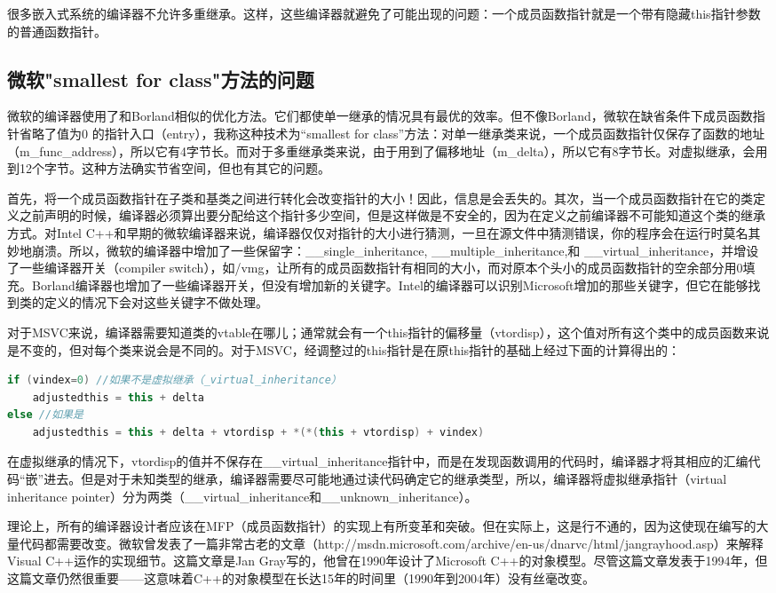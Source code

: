 \documentclass{article}
\begin{document}
\begin{CJK}{UTF8}{gbsn}
很多嵌入式系统的编译器不允许多重继承。这样，这些编译器就避免了可能出现的问题：一个成员函数指针就是一个带有隐藏this指针参数的普通函数指针。

\subsection{微软"smallest for class"方法的问题}
微软的编译器使用了和Borland相似的优化方法。它们都使单一继承的情况具有最优的效率。但不像Borland，微软在缺省条件下成员函数指针省略了值为0 的指针入口（entry），我称这种技术为“smallest for class”方法：对单一继承类来说，一个成员函数指针仅保存了函数的地址（m\_func\_address），所以它有4字节长。而对于多重继承类来说，由于用到了偏移地址（m\_delta），所以它有8字节长。对虚拟继承，会用到12个字节。这种方法确实节省空间，但也有其它的问题。

首先，将一个成员函数指针在子类和基类之间进行转化会改变指针的大小！因此，信息是会丢失的。其次，当一个成员函数指针在它的类定义之前声明的时候，编译器必须算出要分配给这个指针多少空间，但是这样做是不安全的，因为在定义之前编译器不可能知道这个类的继承方式。对Intel C++和早期的微软编译器来说，编译器仅仅对指针的大小进行猜测，一旦在源文件中猜测错误，你的程序会在运行时莫名其妙地崩溃。所以，微软的编译器中增加了一些保留字：\_\_single\_inheritance, \_\_multiple\_inheritance,和 \_\_virtual\_inheritance，并增设了一些编译器开关（compiler switch），如/vmg，让所有的成员函数指针有相同的大小，而对原本个头小的成员函数指针的空余部分用0填充。Borland编译器也增加了一些编译器开关，但没有增加新的关键字。Intel的编译器可以识别Microsoft增加的那些关键字，但它在能够找到类的定义的情况下会对这些关键字不做处理。

对于MSVC来说，编译器需要知道类的vtable在哪儿；通常就会有一个this指针的偏移量（vtordisp），这个值对所有这个类中的成员函数来说是不变的，但对每个类来说会是不同的。对于MSVC，经调整过的this指针是在原this指针的基础上经过下面的计算得出的：
\begin{lstlisting}[language=c++]
if (vindex=0) //如果不是虚拟继承（_virtual_inheritance）
    adjustedthis = this + delta
else //如果是
    adjustedthis = this + delta + vtordisp + *(*(this + vtordisp) + vindex)
\end{lstlisting}
在虚拟继承的情况下，vtordisp的值并不保存在\_\_virtual\_inheritance指针中，而是在发现函数调用的代码时，编译器才将其相应的汇编代码“嵌”进去。但是对于未知类型的继承，编译器需要尽可能地通过读代码确定它的继承类型，所以，编译器将虚拟继承指针（virtual inheritance pointer）分为两类（\_\_virtual\_inheritance和\_\_unknown\_inheritance）。

理论上，所有的编译器设计者应该在MFP（成员函数指针）的实现上有所变革和突破。但在实际上，这是行不通的，因为这使现在编写的大量代码都需要改变。微软曾发表了一篇非常古老的文章（http://msdn.microsoft.com/archive/en-us/dnarvc/html/jangrayhood.asp）来解释Visual C++运作的实现细节。这篇文章是Jan Gray写的，他曾在1990年设计了Microsoft C++的对象模型。尽管这篇文章发表于1994年，但这篇文章仍然很重要——这意味着C++的对象模型在长达15年的时间里（1990年到2004年）没有丝毫改变。


\end{CJK}
\end{document}
